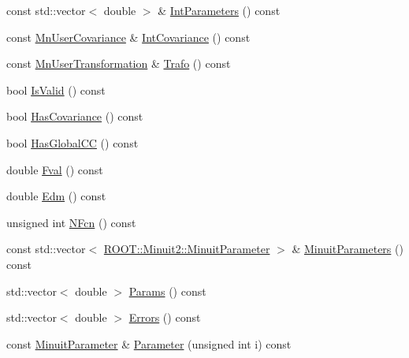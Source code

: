 \begin{DoxyCompactItemize}
const std\+::vector$<$ double $>$ \& \mbox{\hyperlink{classROOT_1_1Minuit2_1_1MnUserParameterState_a090cbf6f0d6efe452e90e4d9c4425d94}{Int\+Parameters}} () const
\item 
const \mbox{\hyperlink{classROOT_1_1Minuit2_1_1MnUserCovariance}{Mn\+User\+Covariance}} \& \mbox{\hyperlink{classROOT_1_1Minuit2_1_1MnUserParameterState_ad4b67f98845868977a7b7d99c8ffbe2d}{Int\+Covariance}} () const
\item 
const \mbox{\hyperlink{classROOT_1_1Minuit2_1_1MnUserTransformation}{Mn\+User\+Transformation}} \& \mbox{\hyperlink{classROOT_1_1Minuit2_1_1MnUserParameterState_a7184e94a20e923d68f1fb00ab5c549b2}{Trafo}} () const
\item 
bool \mbox{\hyperlink{classROOT_1_1Minuit2_1_1MnUserParameterState_a39247e265c2ae73c1290a8ecd4cd73be}{Is\+Valid}} () const
\item 
bool \mbox{\hyperlink{classROOT_1_1Minuit2_1_1MnUserParameterState_ae2a189c702627adba401bd2654a04254}{Has\+Covariance}} () const
\item 
bool \mbox{\hyperlink{classROOT_1_1Minuit2_1_1MnUserParameterState_aca4004d4a59d41f32f6031b55c0088db}{Has\+Global\+CC}} () const
\item 
double \mbox{\hyperlink{classROOT_1_1Minuit2_1_1MnUserParameterState_ab231f5e0a1fa3314210f7849ab382b86}{Fval}} () const
\item 
double \mbox{\hyperlink{classROOT_1_1Minuit2_1_1MnUserParameterState_a4bf3ac21744e5ffe2d58eec66885f958}{Edm}} () const
\item 
unsigned int \mbox{\hyperlink{classROOT_1_1Minuit2_1_1MnUserParameterState_a21fb0f06261f9bed8359263a99f7d5ca}{N\+Fcn}} () const
\item 
const std\+::vector$<$ \mbox{\hyperlink{classROOT_1_1Minuit2_1_1MinuitParameter}{R\+O\+O\+T\+::\+Minuit2\+::\+Minuit\+Parameter}} $>$ \& \mbox{\hyperlink{classROOT_1_1Minuit2_1_1MnUserParameterState_aa9ad12f80ace3d55a1055b836293beec}{Minuit\+Parameters}} () const
\item 
std\+::vector$<$ double $>$ \mbox{\hyperlink{classROOT_1_1Minuit2_1_1MnUserParameterState_af9ed845d2a223223497414296477889f}{Params}} () const
\item 
std\+::vector$<$ double $>$ \mbox{\hyperlink{classROOT_1_1Minuit2_1_1MnUserParameterState_ae054d826075fa4fb7dac12a60afdef63}{Errors}} () const
\item 
const \mbox{\hyperlink{classROOT_1_1Minuit2_1_1MinuitParameter}{Minuit\+Parameter}} \& \mbox{\hyperlink{classROOT_1_1Minuit2_1_1MnUserParameterState_a8a3fa916f75abaa442d96ab3af55a5af}{Parameter}} (unsigned int i) const

\end{DoxyCompactItemize}
